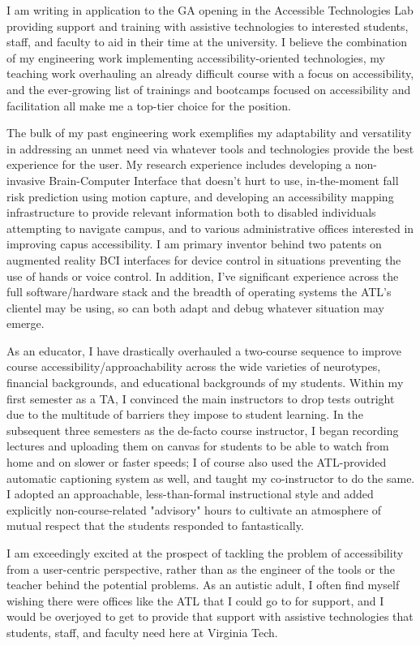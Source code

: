 
I am writing in application to the GA opening in the Accessible Technologies Lab providing support and training with assistive technologies to interested students, staff, and faculty to aid in their time at the university. I believe the combination of my engineering work implementing accessibility-oriented technologies, my teaching work overhauling an already difficult course with a focus on accessibility, and the ever-growing list of trainings and bootcamps focused on accessibility and facilitation all make me a top-tier choice for the position.

The bulk of my past engineering work exemplifies my adaptability and versatility in addressing an unmet need via whatever tools and technologies provide the best experience for the user. My research experience includes developing a non-invasive Brain-Computer Interface that doesn't hurt to use, in-the-moment fall risk prediction using motion capture, and developing an accessibility mapping infrastructure to provide relevant information both to disabled individuals attempting to navigate campus, and to various administrative offices interested in improving capus accessibility. I am primary inventor behind two patents on augmented reality BCI interfaces for device control in situations preventing the use of hands or voice control. In addition, I've significant experience across the full software/hardware stack and the breadth of operating systems the ATL's clientel may be using, so can both adapt and debug whatever situation may emerge.

As an educator, I have drastically overhauled a two-course sequence to improve course accessibility/approachability across the wide varieties of neurotypes, financial backgrounds, and educational backgrounds of my students. Within my first semester as a TA, I convinced the main instructors to drop tests outright due to the multitude of barriers they impose to student learning. In the subsequent three semesters as the de-facto course instructor, I began recording lectures and uploading them on canvas for students to be able to watch from home and on slower or faster speeds; I of course also used the ATL-provided automatic captioning system as well, and taught my co-instructor to do the same. I adopted an approachable, less-than-formal instructional style and added explicitly non-course-related "advisory" hours to cultivate an atmosphere of mutual respect that the students responded to fantastically. 

I am exceedingly excited at the prospect of tackling the problem of accessibility from a user-centric perspective, rather than as the engineer of the tools or the teacher behind the potential problems. As an autistic adult, I often find myself wishing there were offices like the ATL that I could go to for support, and I would be overjoyed to get to provide that support with assistive technologies that students, staff, and faculty need here at Virginia Tech.
